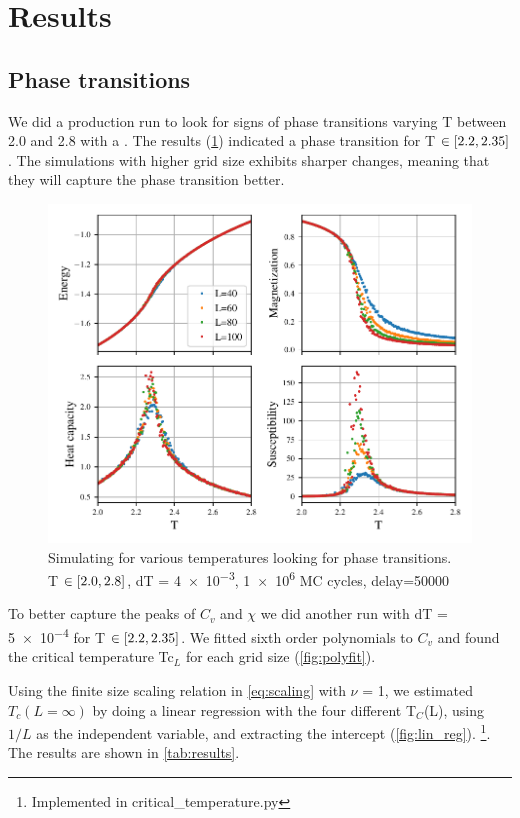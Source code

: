 \section{Results}

\subsection{Phase transitions}

We did a production run to look for signs of phase transitions varying T between
2.0 and 2.8 with a .
The results (\cref{fig:phase}) indicated a phase transition for T $\in
\left[2.2,2.35\right]$. The simulations with higher grid size exhibits sharper
changes, meaning that they will capture the phase transition better.

\begin{figure}[H]
  \centering
  \includegraphics[width=\textwidth]{../figures/phase.pdf}
  \caption{Simulating for various temperatures looking for phase transitions.\\
  T $\in \left[2.0,2.8\right]$, dT = \num{4e-3}, \num{1e6} MC cycles, delay=50000}
  \label{fig:phase}
\end{figure}


To better capture the peaks of $C_v$ and $\chi$ we did another
run with dT = \num{5e-4} for T $\in \left[2.2, 2.35\right]$.
 We fitted sixth order polynomials to $C_v$ and found
the critical temperature Tc$_{L}$ for each grid size (\ref{fig:polyfit}).


Using the finite size scaling relation in
\cref{eq:scaling} with $\nu$ = 1, we estimated $T_c(L=\infty)$
by doing a linear
regression with the four different T$_C$(L), using $1/L$ as the independent
variable, and extracting the intercept (\cref{fig:lin_reg}).
\footnote{Implemented in critical\_temperature.py}. The results are shown in
\cref{tab:results}.

